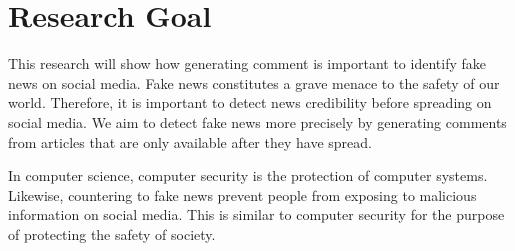 \section{Research Goal}
This research will show how generating comment is important to identify fake news on social media.
Fake news constitutes a grave menace to the safety of our world.
Therefore, it is important to detect news credibility before spreading on social media.
We aim to detect fake news more precisely by generating comments from articles that are only available after they have spread.

In computer science, computer security is the protection of computer systems.
Likewise, countering to fake news prevent people from exposing to malicious information on social media.
This is similar to computer security for the purpose of protecting the safety of society.